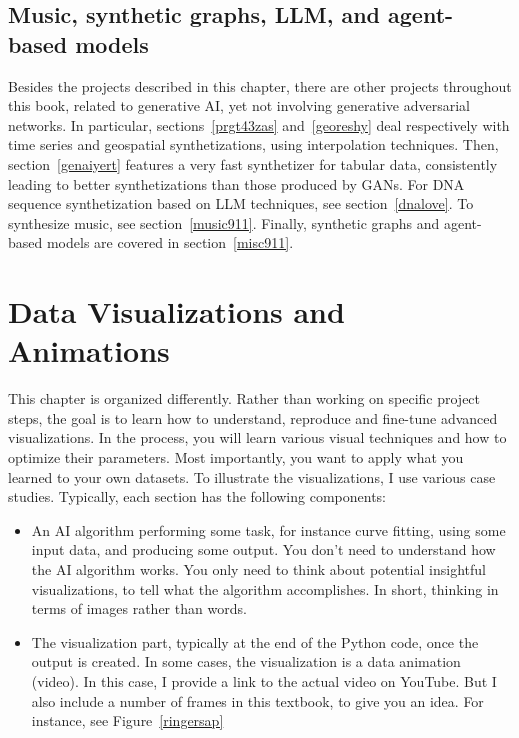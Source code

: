 \documentclass[oneside,10pt]{book}
\begin{document}
\section{Music, synthetic graphs, LLM, and agent-based models}

Besides the projects described in this chapter, there are other projects throughout this book, related to
 generative AI, yet not involving generative adversarial networks. In particular, sections~\ref{prgt43zas} and~\ref{georeshy} deal respectively with time series and geospatial synthetizations, using interpolation techniques. Then, 
section~\ref{genaiyert} features a very fast synthetizer for tabular data, consistently leading to better synthetizations than those produced by GANs.
For DNA sequence synthetization based on LLM techniques, see section~\ref{dnalove}. To synthesize music,
 see section~\ref{music911}. Finally, synthetic graphs and agent-based models are covered in section~\ref{misc911}.











\chapter{Data Visualizations and Animations}

This chapter is organized differently. Rather than working on specific project steps, the goal is to learn how to understand, reproduce 
 and fine-tune advanced visualizations. In the process, you will learn various visual techniques and how to optimize their parameters. Most importantly, you want to apply what you learned to your own datasets.  To illustrate the visualizations,  I use various case studies. 
Typically, each section has the following components:\vspace{1ex}

\begin{itemize}
\item An AI algorithm performing some task, for instance curve fitting, using some input data, and producing some output. You don't need
 to understand how the AI algorithm works. You only need to think about potential insightful visualizations, to tell what the algorithm 
 accomplishes. In short, thinking in terms of images rather than words.
\vspace{1ex}
\item The visualization part, typically at the end of the Python code, once the output is created. In some cases, the visualization is a data animation (video). In this case, I provide a link to the actual video on YouTube. But I also include a number of frames in this textbook, to give you an idea. For instance, see Figure~\ref{ringersap}
\end{itemize}
\vspace{1ex}
\end{document}
